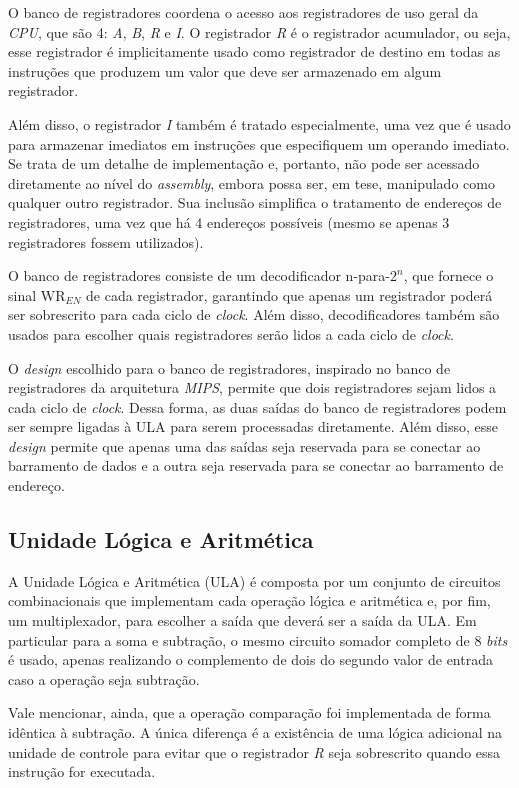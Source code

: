 \documentclass[a4paper,12pt]{report}
\begin{document}
O banco de registradores coordena o acesso aos registradores de uso geral da \textit{CPU},
que são 4: \textit{A}, \textit{B}, \textit{R} e \textit{I}. O registrador \textit{R} é o 
registrador acumulador, ou seja, esse registrador é implicitamente usado como registrador de 
destino em todas as instruções que produzem um valor que deve ser armazenado em algum registrador.

Além disso, o registrador \textit{I} também é tratado especialmente, uma vez que é usado 
para armazenar imediatos em instruções que especifiquem um operando imediato. Se trata 
de um detalhe de implementação e, portanto, não pode ser acessado diretamente ao nível 
do \textit{assembly}, embora possa ser, em tese, manipulado como qualquer outro registrador. 
Sua inclusão simplifica o tratamento de endereços de registradores, uma vez que há 4 endereços 
possíveis (mesmo se apenas 3 registradores fossem utilizados).

O banco de registradores consiste de um decodificador n-para-$2^n$, que fornece o sinal 
$\textrm{WR}_{EN}$ de cada registrador, garantindo que apenas um registrador poderá ser 
sobrescrito para cada ciclo de \textit{clock}. Além disso, decodificadores também são usados
para escolher quais registradores serão lidos a cada ciclo de \textit{clock}.

O \textit{design} escolhido para o banco de registradores, inspirado no banco de registradores
da arquitetura \textit{MIPS}, permite que dois registradores sejam lidos a cada ciclo de \textit{clock}.
Dessa forma, as duas saídas do banco de registradores podem ser sempre ligadas à ULA para serem 
processadas diretamente. Além disso, esse \textit{design} permite que apenas uma das saídas seja 
reservada para se conectar ao barramento de dados e a outra seja reservada para se conectar ao 
barramento de endereço.

\subsection*{Unidade Lógica e Aritmética}

A Unidade Lógica e Aritmética (ULA) é composta por um conjunto de circuitos combinacionais que
implementam cada operação lógica e aritmética e, por fim, um multiplexador, para escolher a saída
que deverá ser a saída da ULA. Em particular para a soma e subtração, o mesmo circuito somador 
completo de 8 \textit{bits} é usado, apenas realizando o complemento de dois do segundo valor de
entrada caso a operação seja subtração. 

Vale mencionar, ainda, que a operação comparação foi implementada de forma idêntica à subtração. 
A única diferença é a existência de uma lógica adicional na unidade de controle para evitar que 
o registrador \textit{R} seja sobrescrito quando essa instrução for executada. 
\end{document}

